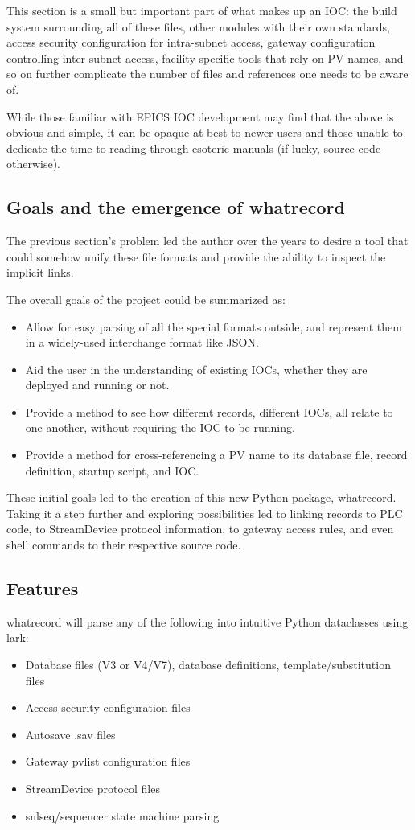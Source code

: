 \documentclass[letter,
               keeplastbox,   %
               ]{jacow}
\begin{document}
This section is a small but important part of what makes up an IOC: the build
system surrounding all of these files, other modules with their own standards,
access security configuration for intra-subnet access, gateway configuration
controlling inter-subnet access, facility-specific tools that rely on PV
names, and so on further complicate the number of files and references
one needs to be aware of.

While those familiar with EPICS IOC development may find that the above is
obvious and simple, it can be opaque at best to newer users and those unable to
dedicate the time to reading through esoteric manuals (if lucky, source code
otherwise).

\subsection{Goals and the emergence of whatrecord}

The previous section's problem led the author over the years to desire a tool
that could somehow unify these file formats and provide the ability to inspect
the implicit links.

The overall goals of the project could be summarized as:
\begin{itemize}
  \item Allow for easy parsing of all the special formats outside, and
    represent them in a widely-used interchange format like JSON.
  \item Aid the user in the understanding of existing IOCs, whether they are
    deployed and running or not.
  \item Provide a method to see how different records, different IOCs, all
    relate to one another, without requiring the IOC to be running.
  \item Provide a method for cross-referencing a PV name to its database
    file, record definition, startup script, and IOC.
\end{itemize}

These initial goals led to the creation of this new Python package, whatrecord.
Taking it a step further and exploring possibilities led to linking records to
PLC code, to StreamDevice protocol information, to gateway access rules, 
and even shell commands to their respective source code.

\subsection{Features}
whatrecord will parse any of the following into intuitive Python dataclasses using lark:
\begin{itemize}
  \item Database files (V3 or V4/V7), database definitions, template/substitution files
  \item Access security configuration files
  \item Autosave .sav files
  \item Gateway pvlist configuration files
  \item StreamDevice protocol files
  \item snlseq/sequencer state machine parsing
\end{itemize}
\end{document}
